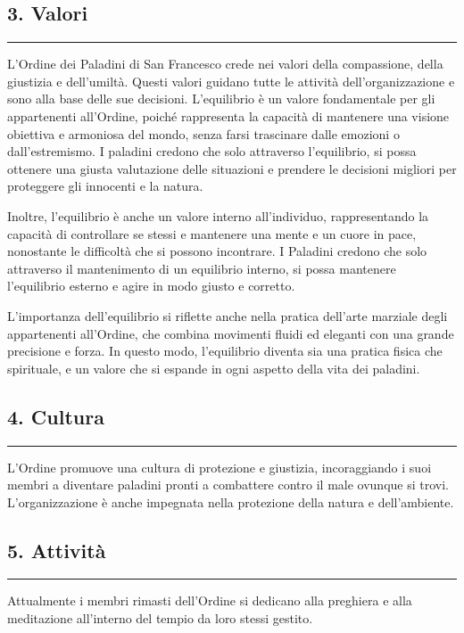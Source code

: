 \subsection{3. Valori}\label{valori}

\begin{center}\rule{0.5\linewidth}{0.5pt}\end{center}

L'Ordine dei Paladini di San Francesco crede nei valori della
compassione, della giustizia e dell'umiltà. Questi valori guidano tutte
le attività dell'organizzazione e sono alla base delle sue decisioni.
L'equilibrio è un valore fondamentale per gli appartenenti all'Ordine,
poiché rappresenta la capacità di mantenere una visione obiettiva e
armoniosa del mondo, senza farsi trascinare dalle emozioni o
dall'estremismo. I paladini credono che solo attraverso l'equilibrio, si
possa ottenere una giusta valutazione delle situazioni e prendere le
decisioni migliori per proteggere gli innocenti e la natura.

Inoltre, l'equilibrio è anche un valore interno all'individuo,
rappresentando la capacità di controllare se stessi e mantenere una
mente e un cuore in pace, nonostante le difficoltà che si possono
incontrare. I Paladini credono che solo attraverso il mantenimento di un
equilibrio interno, si possa mantenere l'equilibrio esterno e agire in
modo giusto e corretto.

L'importanza dell'equilibrio si riflette anche nella pratica dell'arte
marziale degli appartenenti all'Ordine, che combina movimenti fluidi ed
eleganti con una grande precisione e forza. In questo modo, l'equilibrio
diventa sia una pratica fisica che spirituale, e un valore che si
espande in ogni aspetto della vita dei paladini.

\subsection{4. Cultura}\label{cultura}

\begin{center}\rule{0.5\linewidth}{0.5pt}\end{center}

L'Ordine promuove una cultura di protezione e giustizia, incoraggiando i
suoi membri a diventare paladini pronti a combattere contro il male
ovunque si trovi. L'organizzazione è anche impegnata nella protezione
della natura e dell'ambiente.

\subsection{5. Attività}\label{attivituxe0}

\begin{center}\rule{0.5\linewidth}{0.5pt}\end{center}

Attualmente i membri rimasti dell'Ordine si dedicano alla preghiera e
alla meditazione all'interno del tempio da loro stessi gestito.
